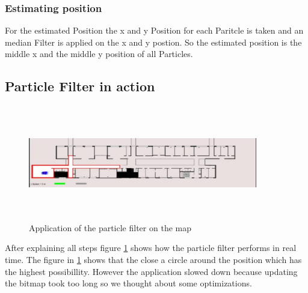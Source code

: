 \documentclass[conference]{IEEEtran}
\begin{document}
\subsubsection{Estimating position}
For the estimated Position the x and y Position for each Paritcle is taken and an median Filter is applied on the x and y postion. So the estimated position is the middle x and the middle y position of all Particles.
\subsection{Particle Filter in action}
\begin{figure}
\includegraphics[height = 5cm,width = 10cm]{Images/particle_in_action.png}
\centering
\caption{Application  of the particle filter on the map}
\label{fig:particleinaction}
\end{figure}
After explaining all steps figure \ref{fig:particleinaction} shows how the particle filter performs in real time. The figure in \ref{fig:particleinaction} shows that the close a circle around the position which has the highest possibillity. However the application slowed down because updating the bitmap took too long so we thought about some optimizations.
\end{document}
